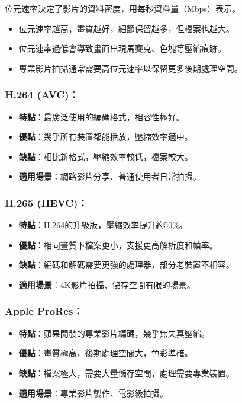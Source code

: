 位元速率決定了影片的資料密度，用每秒資料量（Mbps）表示。

\begin{itemize}
  \item 位元速率越高，畫質越好，細節保留越多，但檔案也越大。
  \item 位元速率過低會導致畫面出現馬賽克、色塊等壓縮痕跡。
  \item 專業影片拍攝通常需要高位元速率以保留更多後期處理空間。
\end{itemize}


\subsubsection*{H.264 (AVC)：}

\begin{itemize}
  \item \textbf{特點}：最廣泛使用的編碼格式，相容性極好。
  \item \textbf{優點}：幾乎所有裝置都能播放，壓縮效率適中。
  \item \textbf{缺點}：相比新格式，壓縮效率較低，檔案較大。
  \item \textbf{適用場景}：網路影片分享、普通使用者日常拍攝。
\end{itemize}

\subsubsection*{H.265 (HEVC)：}

\begin{itemize}
  \item \textbf{特點}：H.264的升級版，壓縮效率提升約50\%。
  \item \textbf{優點}：相同畫質下檔案更小，支援更高解析度和幀率。
  \item \textbf{缺點}：編碼和解碼需要更強的處理器，部分老裝置不相容。
  \item \textbf{適用場景}：4K影片拍攝、儲存空間有限的場景。
\end{itemize}

\subsubsection*{Apple ProRes：}

\begin{itemize}
  \item \textbf{特點}：蘋果開發的專業影片編碼，幾乎無失真壓縮。
  \item \textbf{優點}：畫質極高，後期處理空間大，色彩準確。
  \item \textbf{缺點}：檔案極大，需要大量儲存空間，處理需要專業裝置。
  \item \textbf{適用場景}：專業影片製作、電影級拍攝。
\end{itemize}

